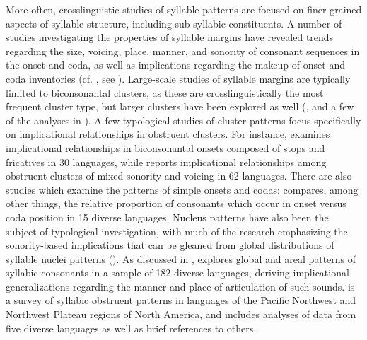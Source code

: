   More often, crosslinguistic studies of syllable patterns are focused on finer-grain\-ed aspects of syllable structure, including sub-syllabic constituents. A number of studies investigating the properties of syllable margins have revealed trends regarding the size, voicing, place, manner, and sonority of consonant sequences in the onset and coda, as well as implications regarding the makeup of onset and coda inventories (cf. \citealt{Greenberg19651978}, see ). Large-scale studies of syllable margins are typically limited to biconsonantal clusters, as these are crosslinguistically the most frequent cluster type, but larger clusters have been explored as well (\citealt{VanDam2004}, and a few of the analyses in \citealt{Greenberg19651978}). A few typological studies of cluster patterns focus specifically on implicational relationships in obstruent clusters. For instance, \citet{Morelli1999,Morelli2003} examines implicational relationships in biconsonantal onsets composed of stops and fricatives in 30 languages, while \citet{Kreitman2008} reports implicational relationships among obstruent clusters of mixed sonority and voicing in 62 languages. There are also studies which examine the patterns of simple onsets and codas: \citet{Rousset2004} compares, among other things, the relative proportion of consonants which occur in onset versus coda position in 15 diverse languages. Nucleus patterns have also been the subject of typological investigation, with much of the research emphasizing the sonority-based implications that can be gleaned from global distributions of syllable nuclei patterns (\citealt{Blevins1995,Zec2007}). As discussed in , \citet{Bell1978a} explores global and areal patterns of syllabic consonants in a sample of 182 diverse languages, deriving implicational generalizations regarding the manner and place of articulation of such sounds. \citet{Hoard1978} is a survey of syllabic obstruent patterns in languages of the Pacific Northwest and Northwest Plateau regions of North America, and includes analyses of data from five diverse languages as well as brief references to others.

